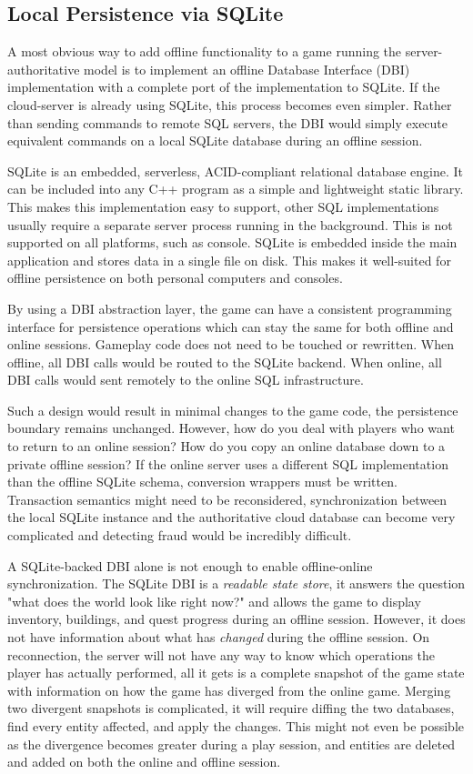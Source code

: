 \documentclass{article}
\begin{document}
\subsection{Local Persistence via SQLite}
\label{sec:sqliteimp}

A most obvious way to add offline functionality to a game running the server-authoritative model is to implement an offline Database Interface (DBI) implementation with a complete port of the implementation to SQLite. If the cloud-server is already using SQLite, this process becomes even simpler. Rather than sending commands to remote SQL servers, the DBI would simply execute equivalent commands on a local SQLite database during an offline session.

SQLite \autocite{sqliteorg} is an embedded, serverless, ACID-compliant relational database engine. It can be included into any C++ program as a simple and lightweight static library. This makes this implementation easy to support, other SQL implementations usually require a separate server process running in the background. This is not supported on all platforms, such as console. SQLite is embedded inside the main application and stores data in a single file on disk. This makes it well-suited for offline persistence on both personal computers and consoles.

By using a DBI abstraction layer, the game can have a consistent programming interface for persistence operations which can stay the same for both offline and online sessions. Gameplay code does not need to be touched or rewritten. When offline, all DBI calls would be routed to the SQLite backend. When online, all DBI calls would sent remotely to the online SQL infrastructure.

Such a design would result in minimal changes to the game code, the persistence boundary remains unchanged. However, how do you deal with players who want to return to an online session? How do you copy an online database down to a private offline session? If the online server uses a different SQL implementation than the offline SQLite schema, conversion wrappers must be written. Transaction semantics might need to be reconsidered, synchronization between the local SQLite instance and the authoritative cloud database can become very complicated and detecting fraud would be incredibly difficult.

A SQLite-backed DBI alone is not enough to enable offline-online synchronization. The SQLite DBI is a \emph{readable state store}, it answers the question "what does the world look like right now?" and allows the game to display inventory, buildings, and quest progress during an offline session. However, it does not have information about what has \emph{changed} during the offline session. On reconnection, the server will not have any way to know which operations the player has actually performed, all it gets is a complete snapshot of the game state with information on how the game has diverged from the online game. Merging two divergent snapshots is complicated, it will require diffing the two databases, find every entity affected, and apply the changes. This might not even be possible as the divergence becomes greater during a play session, and entities are deleted and added on both the online and offline session.
\end{document}
